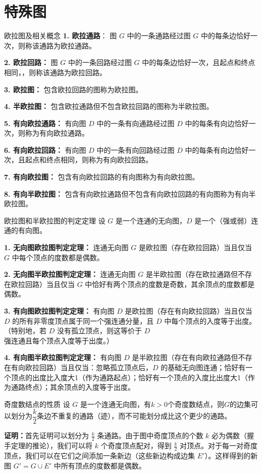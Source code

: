 \section{特殊图}
\begin{definition}{欧拉图及相关概念}{}
\textbf{1. 欧拉通路}：
图 $G$ 中的一条通路经过图 $G$ 中的每条边恰好一次，则称该通路为欧拉通路。

\textbf{2. 欧拉回路：}
图 $G$ 中的一条回路经过图 $G$ 中的每条边恰好一次，且起点和终点相同，，则称该通路为欧拉回路。

\textbf{3. 欧拉图：}
包含欧拉回路的图称为欧拉图。

\textbf{4. 半欧拉图：}
包含欧拉通路但不包含欧拉回路的图称为半欧拉图。

\textbf{5. 有向欧拉通路：}
有向图 $D$ 中的一条有向通路经过图 $D$ 中的每条有向边恰好一次，则称为有向欧拉通路。

\textbf{6. 有向欧拉回路：}
有向图 $D$ 中的一条有向回路经过图 $D$ 中的每条有向边恰好一次，且起点和终点相同，则称为有向欧拉回路。

\textbf{7. 有向欧拉图：}
包含有向欧拉回路的有向图称为有向欧拉图。

\textbf{8. 有向半欧拉图：}
包含有向欧拉通路但不包含有向欧拉回路的有向图称为有向半欧拉图。
\end{definition}
\begin{theorem}{欧拉图和半欧拉图的判定定理}{}
设 $G$ 是一个连通的无向图，$D$ 是一个（强或弱）连通的有向图。

\textbf{1. 无向图欧拉图判定定理：}
连通无向图 $G$ 是欧拉图（存在欧拉回路）当且仅当 $G$ 中每个顶点的度数都是偶数。

\textbf{2. 无向图半欧拉图判定定理：}
连通无向图 $G$ 是半欧拉图（存在欧拉通路但不存在欧拉回路）当且仅当 $G$ 中恰好有两个顶点的度数是奇数，其余顶点的度数都是偶数。

\textbf{3. 有向图欧拉图判定定理：}
有向图 $D$ 是欧拉图（存在有向欧拉回路）当且仅当 $D$ 的所有非零度顶点属于同一个强连通分量，且 $D$ 中每个顶点的入度等于出度。（特别地，若 $D$ 没有孤立顶点，则这等价于 $D$ 强连通且每个顶点入度等于出度。）

\textbf{4. 有向图半欧拉图判定定理：}
有向图 $D$ 是半欧拉图（存在有向欧拉通路但不存在有向欧拉回路）当且仅当：忽略孤立顶点后，$D$ 的基础无向图连通；恰好有一个顶点的出度比入度大1（作为通路起点）；恰好有一个顶点的入度比出度大1（作为通路终点）；其余顶点的入度等于出度。
\end{theorem}
\begin{theorem}{奇度数结点的性质}{}
    设 $G$ 是一个连通无向图，有$k>0$个奇度数结点，则$G$的边集可以划分为$\dfrac{k}2$条边不重复的通路（迹），而不可能划分成比这个更少的通路。
\end{theorem}
\textbf{证明：}首先证明可以划分为 $\frac{k}{2}$ 条通路。由于图中奇度顶点的个数 $k$ 必为偶数（握手定理的推论），我们可以将 $k$ 个奇度顶点配对，得到 $\frac{k}{2}$ 对顶点。对于每一对奇度顶点，我们可以在它们之间添加一条新边（这些新边构成边集 $E'$）。这样得到的新图 $G' = G \cup E'$ 中所有顶点的度数都是偶数。

